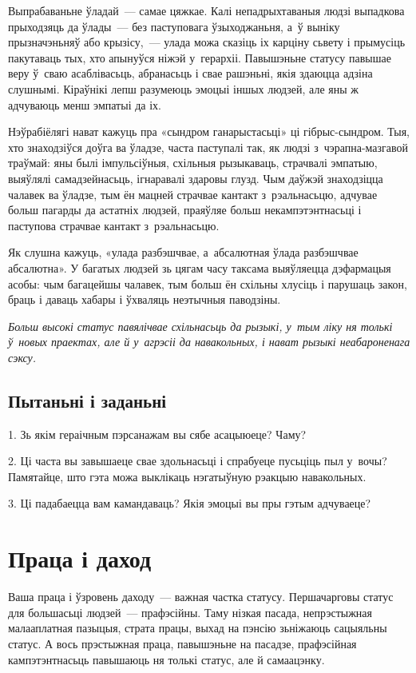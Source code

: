 Выпрабаваньне ўладай~--- самае цяжкае. Калі непадрыхтаваныя людзі выпадкова прыходзяць да ўлады~--- без паступовага ўзыходжаньня, а~ў выніку прызначэньняў або крызісу,~--- улада можа сказіць іх карціну сьвету і прымусіць пакутаваць тых, хто апынуўся ніжэй у~герархіі. Павышэньне статусу павышае веру ў~сваю асаблівасьць, абранасьць і свае рашэньні, якія здаюцца адзіна слушнымі. Кіраўнікі лепш разумеюць эмоцыі іншых людзей, але яны ж адчуваюць менш эмпатыі да іх.

Нэўрабіёлягі нават кажуць пра «сындром ганарыстасьці» ці гібрыс-сындром. Тыя, хто знаходзіўся доўга ва ўладзе, часта паступалі так, як людзі з~чэрапна-мазгавой траўмай: яны былі імпульсіўныя, схільныя рызыкаваць, страчвалі эмпатыю, выяўлялі самадзейнасьць, ігнаравалі здаровы глузд. Чым даўжэй знаходзіцца чалавек ва ўладзе, тым ён мацней страчвае кантакт з~рэальнасьцю, адчувае больш пагарды да астатніх людзей, праяўляе больш некампэтэнтнасьці і паступова страчвае кантакт з~рэальнасьцю.

Як слушна кажуць, «улада разбэшчвае, а~абсалютная ўлада разбэшчвае абсалютна». У багатых людзей зь цягам часу таксама выяўляецца дэфармацыя асобы: чым багацейшы чалавек, тым больш ён схільны хлусіць і парушаць закон, браць і даваць хабары і ўхваляць неэтычныя паводзіны. 

\emph{Больш высокі статус павялічвае схільнасьць да рызыкі, у~тым ліку ня толькі ў~новых праектах, але й у~агрэсіі да навакольных, і нават рызыкі неабароненага сэксу.}

\subsection*{Пытаньні і заданьні}

1. Зь якім гераічным пэрсанажам вы сябе асацыюеце? Чаму?

2. Ці часта вы завышаеце свае здольнасьці і спрабуеце пусьціць пыл у~вочы? Памятайце, што гэта можа выклікаць нэгатыўную рэакцыю навакольных.

3. Ці падабаецца вам камандаваць? Якія эмоцыі вы пры гэтым адчуваеце?


\section{Праца і даход}

Ваша праца і ўзровень даходу~--- важная частка статусу. Першачарговы статус для большасьці людзей~--- прафэсійны. Таму нізкая пасада, непрэстыжная малааплатная пазыцыя, страта працы, выхад на пэнсію зьніжаюць сацыяльны статус. А вось прэстыжная праца, павышэньне на пасадзе, прафэсійная кампэтэнтнасьць павышаюць ня толькі статус, але й самаацэнку.


